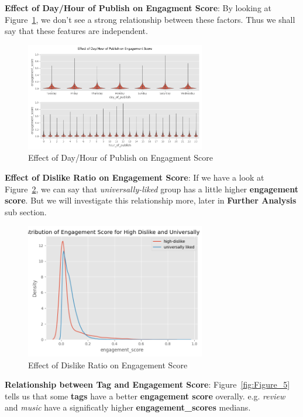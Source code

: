\documentclass[a4paper,12pt]{article}
\begin{document}
\noindent \textbf{Effect of Day/Hour of Publish on Engagment Score}: By looking at Figure~\ref{fig:Figure_3}, we don't see a strong relationship between these factors. Thus we shall say that these features 
are independent.

\begin{figure}[H]
    \centering
    \includegraphics[width=0.7\textwidth]{./images/daily_hourly_pattern_in_eng_score.png}
    \caption{Effect of Day/Hour of Publish on Engagment Score}
    \label{fig:Figure_3}
\end{figure}


\noindent \textbf{Effect of Dislike Ratio on Engagement Score}: If we have a look at Figure~\ref{fig:Figure_4}, we can say that \textit{universally-liked} group has a little higher \textbf{engagement score}. 
But we will investigate this relationship more, later in \textbf{Further Analysis} sub section.

\begin{figure}[H]
    \centering
    \includegraphics[width=0.7\textwidth]{./images/effect_of_high_dislike_on_eng.png}
    \caption{Effect of Dislike Ratio on Engagement Score}
    \label{fig:Figure_4}
\end{figure}


\noindent \textbf{Relationship between Tag and Engagement Score}: Figure~\ref{fig:Figure_5} tells us that some \textbf{tags} have a better \textbf{engagement score} overally. 
e.g. \textit{review} and \textit{music} have a significatly higher \textbf{engagement\_scores} medians.
\end{document}

